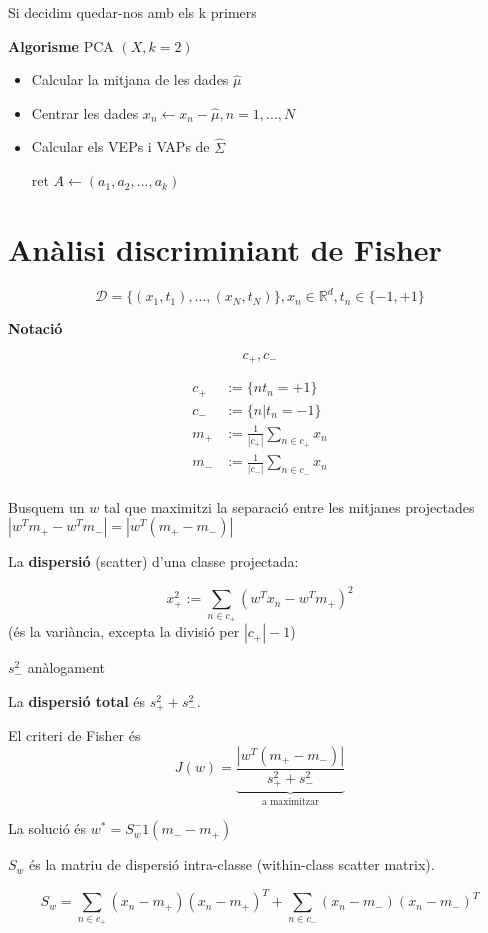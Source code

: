 \documentclass[a4paper]{article}
\begin{document}
	Si decidim quedar-nos amb els k primers 
	
	
	\textbf{Algorisme} PCA $(X, k = 2)$
	
	\begin{itemize}
		\item Calcular la mitjana de les dades $\hat{\mu}$
		\item Centrar les dades $x_n \leftarrow x_n - \hat{\mu}, n = 1, ..., N$
		\item Calcular els VEPs i VAPs de $\hat{\Sigma}$
		
		ret $A \leftarrow (a_1, a_2, ..., a_k)$
	\end{itemize}
	
	\section{Anàlisi discriminiant de Fisher}
	\[ \mathcal{D} = \{(x_1, t_1), ..., (x_N, t_N)\}, x_n \in \mathbb{R}^d, t_n \in \{-1, +1 \} \]
	
	
	\textbf{Notació}
	
	\[ c_+, c_- \]
	
	\begin{equation}
		\begin{aligned}
			c_+ &:= \{ n  t_n = +1 \} \\
			c_- &:= \{ n | t_n = -1 \} \\
			m_+ &:= \frac{1}{|c_+|} \sum_{n\in c_+} x_n \\
			m_- &:= \frac{1}{|c_-|} \sum_{n\in c_-} x_n \\
		\end{aligned}
	\end{equation}
	
	Busquem un $w$ tal que maximitzi la separació entre les mitjanes projectades $|w^Tm_+ - w^Tm_-| = |w^T(m_+ - m_-)|$
	
	La \textbf{dispersió} (scatter) d'una classe projectada:
	
	\[ x_+^2 := \sum_{n \in c_+} (w^Tx_n - w^Tm_+)^2 \]
	(és la variància, excepta la divisió per $|c_+| - 1$)

	$s_-^2$ anàlogament
	
	La \textbf{dispersió total} és $s_+^2 + s_-^2$.
	
	El criteri de Fisher és \[ J(w) = \underbrace{\frac{|w^T(m_+-m_-)|}{s_+^2 + s_-^2}}_\text{a maximitzar} \]
	
	La solució és $w^* = S_w^-1(m_- - m_+)$
	
	$S_w$ és la matriu de dispersió intra-classe (within-class scatter matrix).
	
	\[ S_w = \sum_{n \in c_+} (x_n - m_+)(x_n - m_+)^T + \sum_{n \in c_-} (x_n - m_-)(x_n - m_-)^T \]
	
\end{document}
